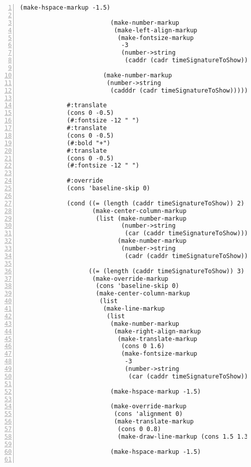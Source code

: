 \begin{Verbatim}[numbers=left,xleftmargin=5mm]
                         (make-hspace-markup -1.5)

                         (make-number-markup
                          (make-left-align-markup
                           (make-fontsize-markup
                            -3
                            (number->string
                             (caddr (cadr timeSignatureToShow))))))))

                       (make-number-markup
                        (number->string
                         (cadddr (cadr timeSignatureToShow)))))))))

             #:translate
             (cons 0 -0.5)
             (#:fontsize -12 " ")
             #:translate
             (cons 0 -0.5)
             (#:bold "+")
             #:translate
             (cons 0 -0.5)
             (#:fontsize -12 " ")

             #:override
             (cons 'baseline-skip 0)

             (cond ((= (length (caddr timeSignatureToShow)) 2)
                    (make-center-column-markup
                     (list (make-number-markup
                            (number->string
                             (car (caddr timeSignatureToShow))))
                           (make-number-markup
                            (number->string
                             (cadr (caddr timeSignatureToShow)))))))

                   ((= (length (caddr timeSignatureToShow)) 3)
                    (make-override-markup
                     (cons 'baseline-skip 0)
                     (make-center-column-markup
                      (list
                       (make-line-markup
                        (list
                         (make-number-markup
                          (make-right-align-markup
                           (make-translate-markup
                            (cons 0 1.6)
                            (make-fontsize-markup
                             -3
                             (number->string
                              (car (caddr timeSignatureToShow)))))))

                         (make-hspace-markup -1.5)

                         (make-override-markup
                          (cons 'alignment 0)
                          (make-translate-markup
                           (cons 0 0.8)
                           (make-draw-line-markup (cons 1.5 1.35))))

                         (make-hspace-markup -1.5)


\end{Verbatim}
